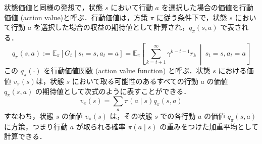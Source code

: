 \documentclass[titlepage]{ltjsbook}
\begin{document}
状態価値と同様の発想で，状態 $s$ において行動 $a$ を選択した場合の価値を行動価値 (action value)と呼ぶ．行動価値は，方策 $\pi$ に従う条件下で，状態 $s$ において行動 $a$ を選択した場合の収益の期待値として計算され，$q_\pi (s, a)$ で表される．
\begin{equation}
q_\pi(s, a) := \mathbb{E}_\pi \left[G_t \mid s_t = s, a_t=a \right]= \mathbb{E}_\pi \left[\sum_{k=t+1}^{\infty}\gamma^{k-t-1} r_{k}\ \middle|\ s_t = s, a_t=a \right]
\end{equation}
この $q_\pi (\cdot)$ を行動価値関数 (action value function) と呼ぶ．状態 $s$ における価値 $v_\pi(s)$は，状態 $s$ において取る可能性のあるすべての行動 $a$ の価値 $q_\pi(s, a)$ の期待値として次式のように表すことができる．
\begin{equation}
v_\pi(s) = \sum_{a} \pi(a \mid s) q_\pi(s, a)
\end{equation}
すなわち，状態 $s$ の価値 $v_\pi(s)$ は，その状態 $s$ での各行動 $a$ の価値 $q_\pi(s, a)$ に方策，つまり行動 $a$ が取られる確率 $\pi(a \mid s)$ の重みをつけた加重平均として計算できる．

\printbibliography[segment=\therefsegment,heading=subbibliography,title={参考文献}]
\end{document}
